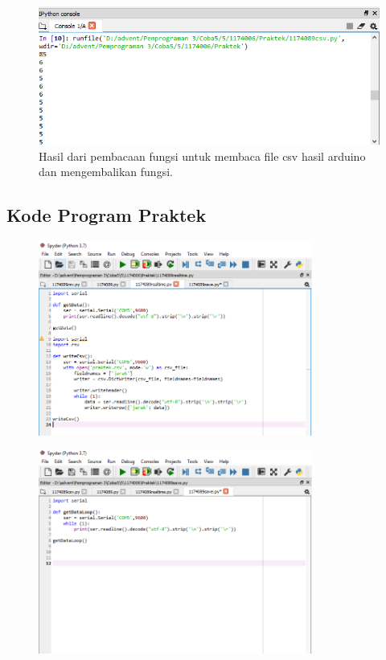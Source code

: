 \begin{figure}[H]
	\includegraphics[width=12cm]{figures/5/1174089/Praktek/4.png}
	\centering
	\caption{Hasil dari pembacaan fungsi untuk membaca file csv hasil arduino dan mengembalikan fungsi.}
\end{figure}

\subsection{Kode Program Praktek}
\begin{figure}[H]
	\includegraphics[width=9cm]{figures/5/1174089/Praktek/realtime.png}
	\centering
\end{figure}

\begin{figure}[H]
	\includegraphics[width=9cm]{figures/5/1174089/Praktek/save.png}
	\centering
\end{figure}

